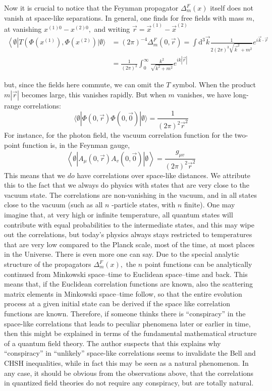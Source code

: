 \documentclass[main.tex]{subfiles}
\begin{document}
Now it is crucial to notice that the Feynman propagator $\Delta_{m}^{F}(x)$ itself does not vanish at space-like separations. In general, one finds for free fields with mass $m,$ at vanishing $x^{(1) 0}-x^{(2) 0},$ and writing $\vec{r}=\vec{x}^{(1)}-\vec{x}^{(2)}$
$$
\begin{aligned}
\left\langle\emptyset\left|T\left(\Phi\left(x^{(1)}\right), \Phi\left(x^{(2)}\right)|\emptyset\rangle\right.\right.\right.&=(2 \pi)^{-4} \Delta_{m}^{F}(0, \vec{r})=\int \mathrm{d}^{3} \vec{k} \frac{1}{2(2 \pi)^{3} \sqrt{\vec{k}^{2}+m^{2}}} e^{i \vec{k} \cdot \vec{r}} \\
&=\frac{1}{(2 \pi)^{2}} \int_{0}^{\infty} \frac{k^{2}}{\sqrt{k^{2}+m^{2}}} e^{i k|\vec{r}|}
\end{aligned}
$$

but, since the fields here commute, we can omit the $T$ symbol. When the product $m|\vec{r}|$ becomes large, this vanishes rapidly. But when $m$ vanishes, we have long-range correlations:
$$
\langle\emptyset|\Phi(0, \vec{r}) \Phi(0, \overrightarrow{0})| \emptyset\rangle=\frac{1}{(2 \pi)^{2} \vec{r}^{2}}
$$
For instance, for the photon field, the vacuum correlation function for the two-point function is, in the Feynman gauge,
$$
\left\langle\emptyset\left|A_{\mu}(0, \vec{r}) A_{v}(0, \overrightarrow{0})\right| \emptyset\right\rangle=\frac{g_{\mu v}}{(2 \pi)^{2} \vec{r}^{2}}
$$
This means that we $d o$ have correlations over space-like distances. We attribute this to the fact that we always do physics with states that are very close to the vacuum state. The correlations are non-vanishing in the vacuum, and in all states close to the vacuum (such as all $n$ -particle states, with $n$ finite). One may imagine that, at very high or infinite temperature, all quantum states will contribute with equal probabilities to the intermediate states, and this may wipe out the correlations, but today's physics always stays restricted to temperatures that are very low compared
to the Planck scale, most of the time, at most places in the Universe. There is even more one can say. Due to the special analytic structure of the propagators $\Delta_{m}^{F}(x),$ the $n$ point functions can be analytically continued from Minkowski space–time to Euclidean space–time and back. This means that, if the Euclidean correlation functions are known, also the scattering matrix elements in Minkowski space–time follow, so that the entire evolution process at a given initial state can be derived if the space like correlation functions are known. Therefore, if someone thinks there is “conspiracy” in the space-like correlations that leads to peculiar phenomena later or earlier in time, then this might be explained in terms of the fundamental mathematical structure of a quantum field theory. The author suspects that
this explains why “conspiracy” in “unlikely” space-like correlations seems to invalidate the Bell and CHSH inequalities, while in fact this may be seen as a natural phenomenon. In any case, it should be obvious from the observations above, that the correlations in quantized field theories do not require any conspiracy, but are totally natural.
\end{document}
